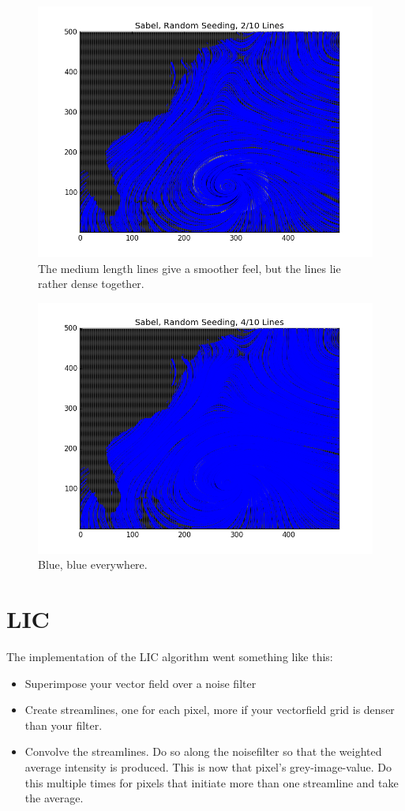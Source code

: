 \documentclass[a4paper,10pt]{report}
\begin{document}
\begin{figure}\centering
 \includegraphics[width=0.9\linewidth]{medium}
 \caption{The medium length lines give a smoother feel, but the lines lie rather dense together.}
 \label{fig4}
\end{figure}
\begin{figure}\centering
 \includegraphics[width=0.9\linewidth]{long}
 \caption{Blue, blue everywhere.}
 \label{fig5}
\end{figure}
\clearpage
\section*{LIC}
The implementation of the LIC algorithm went something like this:
\begin{itemize}
 \item Superimpose your vector field over a noise filter
 \item Create streamlines, one for each pixel, more if your vectorfield grid is denser than your filter.
 \item Convolve the streamlines. Do so along the noisefilter so that the weighted average intensity is produced. This is now that pixel's grey-image-value. Do this multiple times for pixels that initiate more than one streamline and take the average. 
\end{itemize}
\end{document}
